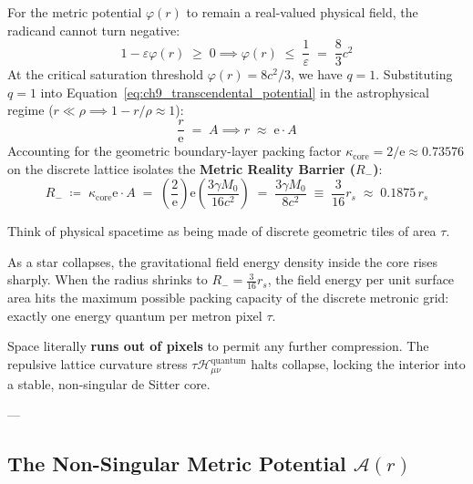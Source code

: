 \documentclass[
    12pt,
    a4paper,
    headings=normal,
    twoside=false,
    open=any,
    parskip=half
]{scrbook}
\newcommand{\eu}{\mathrm{e}}
\begin{document}
For the metric potential $\varphi(r)$ to remain a real-valued physical field, the radicand cannot turn negative:
\begin{equation}
1 - \varepsilon \varphi(r) \;\ge\; 0 \implies \varphi(r) \;\le\; \frac{1}{\varepsilon} \;=\; \frac{8}{3}c^2
\label{eq:ch9_reality_condition}
\end{equation}
At the critical saturation threshold $\varphi(r) = 8c^2/3$, we have $q = 1$. Substituting $q = 1$ into Equation~\eqref{eq:ch9_transcendental_potential} in the astrophysical regime ($r \ll \rho \implies 1 - r/\rho \approx 1$):
\begin{equation}
\frac{r}{\eu} \;=\; A \implies r \;\approx\; \eu \cdot A
\end{equation}
Accounting for the geometric boundary-layer packing factor $\kappa_{\text{core}} = 2/\eu \approx 0.73576$ on the discrete lattice isolates the \textbf{Metric Reality Barrier ($R_-$)}:
\begin{equation}
\boxed{R_- \;\coloneqq\; \kappa_{\text{core}} \eu \cdot A \;=\; \left(\frac{2}{\eu}\right)\eu \left( \frac{3\gamma M_0}{16 c^2} \right) \;=\; \frac{3\gamma M_0}{8 c^2} \;\equiv\; \frac{3}{16} r_s \;\approx\; 0.1875 \, r_s}
\label{eq:ch9_reality_barrier_def}
\end{equation}

\begin{intuitionbox}
Think of physical spacetime as being made of discrete geometric tiles of area $\tau$.

As a star collapses, the gravitational field energy density inside the core rises sharply. When the radius shrinks to $R_- = \frac{3}{16}r_s$, the field energy per unit surface area hits the maximum possible packing capacity of the discrete metronic grid: exactly one energy quantum per metron pixel $\tau$.

Space literally \textbf{runs out of pixels} to permit any further compression. The repulsive lattice curvature stress $\tau \mathcal{H}_{\mu\nu}^{\text{quantum}}$ halts collapse, locking the interior into a stable, non-singular de Sitter core.
\end{intuitionbox}

---

\subsection{The Non-Singular Metric Potential $\mathcal{A}(r)$}
\end{document}
